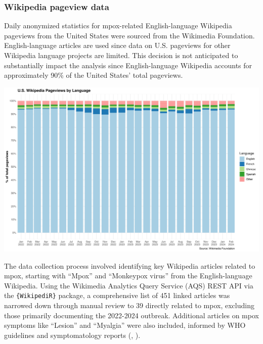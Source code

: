 \documentclass[
  12pt,
]{article}
\begin{document}
\subsubsection{Wikipedia pageview data}\label{wikipedia-pageview-data}

Daily anonymized statistics for mpox-related English-language Wikipedia
pageviews from the United States were sourced from the Wikimedia
Foundation. English-language articles are used since data on U.S.
pageviews for other Wikipedia language projects are limited. This
decision is not anticipated to substantially impact the analysis since
English-language Wikipedia accounts for approximately 90\% of the United
States' total pageviews.

\includegraphics{images/wiki-project-views.png}

The data collection process involved identifying key Wikipedia articles
related to mpox, starting with ``Mpox'' and ``Monkeypox virus'' from the
English-language Wikipedia. Using the Wikimedia Analytics Query Service
(AQS) REST API via the \texttt{\{WikipediR\}} package, a comprehensive
list of 451 linked articles was narrowed down through manual review to
39 directly related to mpox, excluding those primarily documenting the
2022-2024 outbreak. Additional articles on mpox symptoms like ``Lesion''
and ``Myalgia'' were also included, informed by WHO guidelines and
symptomatology reports (,
).
\end{document}

